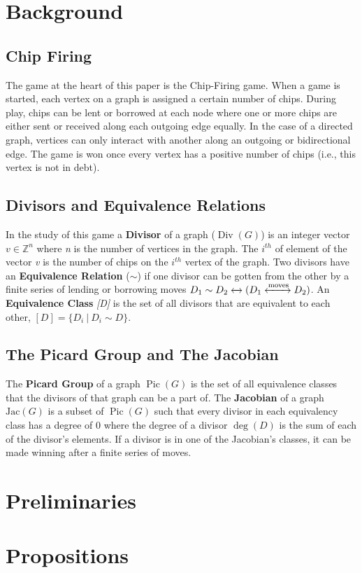 \documentclass[11pt,reqno]{amsart}
\DeclareMathOperator{\Pic}{Pic}
\DeclareMathOperator{\Div}{Div}
\DeclareMathOperator{\Deg}{deg}
\newcommand{\Jac}{\textrm{Jac}}{}
\theoremstyle{definition}
\theoremstyle{plain}
\begin{document}
\section{Background}
	\subsection{Chip Firing}
		The game at the heart of this paper is the Chip-Firing game. When a game is started, each vertex on
		a graph is assigned a certain number of chips.  During play, chips can be lent or borrowed at each
		node where one or more chips are either sent or received along each outgoing edge equally.  In the
		case of a directed graph, vertices can only interact with another along an outgoing or
		bidirectional edge.  The game is won once every vertex has a positive number of chips (i.e., this
		vertex is not in debt).

	\subsection{Divisors and Equivalence Relations}
		In the study of this game a \textbf{Divisor} of a graph ($\Div(G)$) is an integer vector $v\in\mathbb{Z}^n$
		where \textit{n} is the number of vertices in the graph.  The $i^{th}$ of element of the vector \textit{v}
		is the number of chips on the $i^{th}$ vertex of the graph.  Two divisors have an \textbf{Equivalence Relation}
		($\sim$) if one divisor can be gotten from the other by a finite series of lending or borrowing moves
		$D_1 \sim D_2 \xleftrightarrow{} (D_1 \xleftrightarrow{\text{moves}} D_2)$.  An \textbf{Equivalence Class} \textit{[D]}
		is the set of all divisors that are equivalent to each other, $[D] = \{D_i~|~D_i \sim D\}$.

	\subsection{The Picard Group and The Jacobian}
		The \textbf{Picard Group} of a graph $\Pic(G)$ is the set of all equivalence classes that the divisors of that graph can be a
		part of. The \textbf{Jacobian} of a graph  $\Jac(G)$ is a subset of $\Pic(G)$ such that every divisor in each
		equivalency class has a degree of $0$ where the degree of a divisor $\Deg(D)$ is the sum of each of the divisor's elements.
		If a divisor is in one of the Jacobian's classes, it can be made winning after a finite series of moves.
\section{Preliminaries}
\section{Propositions}



\end{document}
